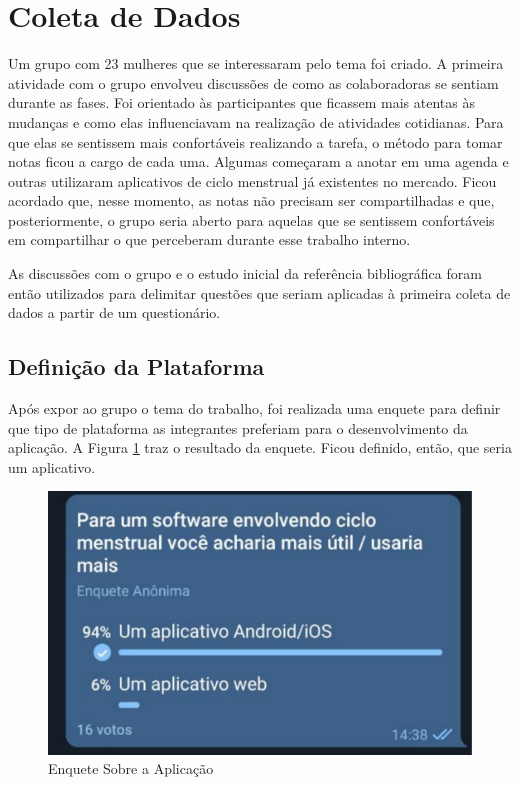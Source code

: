 \section{Coleta de Dados}

Um grupo com 23 mulheres que se interessaram pelo tema foi criado. A primeira 
atividade com o grupo envolveu discussões de como as colaboradoras se sentiam durante as fases. Foi orientado
às participantes que ficassem mais atentas às mudanças e como elas influenciavam na realização de 
atividades cotidianas. Para que elas se sentissem mais confortáveis realizando a tarefa, o método para tomar notas ficou a cargo de cada uma. 
Algumas começaram a anotar em uma agenda e outras utilizaram 
aplicativos de ciclo menstrual já existentes no mercado. Ficou acordado que, 
nesse momento, as notas não precisam ser compartilhadas e que, posteriormente, o grupo seria aberto para 
aquelas que se sentissem confortáveis em compartilhar o que perceberam 
durante esse trabalho interno.

As discussões com o grupo e o estudo inicial da referência bibliográfica foram então utilizados para 
delimitar questões que seriam aplicadas à primeira coleta de dados a partir de um questionário.

\subsection{Definição da Plataforma}

Após expor ao grupo o tema do trabalho, foi realizada uma enquete para definir que tipo de plataforma as 
integrantes preferiam para o desenvolvimento da aplicação. A Figura \ref{fig07} traz o resultado da enquete. Ficou definido, então, que seria 
um aplicativo.

\begin{figure}[ht]
	\centering
	\includegraphics[keepaspectratio=true,scale=0.3]{figuras/enqueteApp.pdf}
	\caption{Enquete Sobre a Aplicação}
        \label{fig07}
\end{figure}

